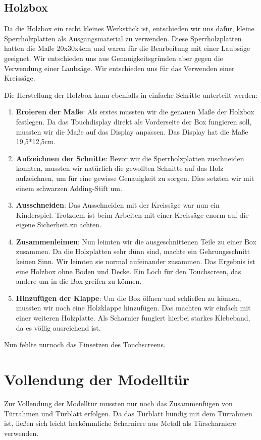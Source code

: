 \subsection{Holzbox}
Da die Holzbox ein recht kleines Werkstück ist, entschieden wir uns dafür, kleine Sperrholzplatten als Ausgangsmaterial zu verwenden.
Diese Sperrholzplatten hatten die Maße 20x30x4cm und waren für die Bearbeitung mit einer Laubsäge geeignet. Wir entschieden uns aus
Genauigkeitsgründen aber gegen die Verwendung einer Laubsäge. Wir entschieden uns für das Verwenden einer Kreissäge.

Die Herstellung der Holzbox kann ebenfalls in einfache Schritte unterteilt werden:
\begin{enumerate}
    \item \textbf{Eroieren der Maße}: Als erstes mussten wir die genauen Maße der Holzbox festlegen. Da das Touchdisplay direkt als
    Vorderseite der Box fungieren soll, mussten wir die Maße auf das Display anpassen. Das Display hat die Maße 19,5*12,5cm.
    \item \textbf{Aufzeichnen der Schnitte}: Bevor wir die Sperrholzplatten zuschneiden konnten, mussten wir natürlich die gewollten
    Schnitte auf das Holz aufzeichnen, um für eine gewisse Genauigkeit zu sorgen. Dies setzten wir mit einem schwarzen Adding-Stift um.
    \item \textbf{Ausschneiden}: Das Ausschneiden mit der Kreissäge war nun ein Kinderspiel. Trotzdem ist beim Arbeiten mit einer Kreissäge
    enorm auf die eigene Sicherheit zu achten.
    \item \textbf{Zusammenleimen}: Nun leimten wir die ausgeschnittenen Teile zu einer Box zusammen. Da die Holzplatten sehr dünn sind,
    machte ein Gehrungsschnitt keinen Sinn. Wir leimten sie normal aufeinander zusammen. Das Ergebnis ist eine Holzbox ohne Boden und Decke.
    Ein Loch für den Touchscreen, das andere um in die Box greifen zu können.
    \item \textbf{Hinzufügen der Klappe}: Um die Box öffnen und schließen zu können, mussten wir noch eine Holzklappe hinzufügen. Das machten
    wir einfach mit einer weiteren Holzplatte. Als Scharnier fungiert hierbei starkes Klebeband, da es völlig ausreichend ist.
\end{enumerate}

Nun fehlte nurnoch das Einsetzen des Touchscreens.


\section{Vollendung der Modelltür}
Zur Vollendung der Modelltür mussten nur noch das Zusammenfügen von Türrahmen und Türblatt erfolgen.
Da das Türblatt bündig mit dem Türrahmen ist, ließen sich leicht herkömmliche Scharniere aus Metall als Türscharniere verwenden.

